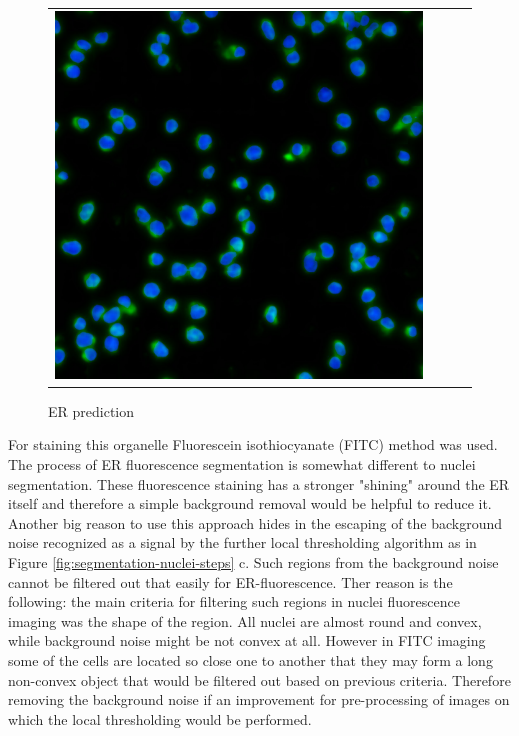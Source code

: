 \begin{figure}[H]
\begin{tabularx}{\textwidth}{YYYY}
            \includegraphics{bilder/ER/gt_nuclei.jpg}
        \end{tabularx}
    \caption{ER prediction}
    \label{fig:er-prediction}
\end{figure}

For staining this organelle Fluorescein isothiocyanate (FITC) method was used. The process of ER fluorescence segmentation is somewhat different to nuclei segmentation. These fluorescence staining has a stronger "shining" around the ER itself and therefore a simple background removal would be helpful to reduce it. Another big reason to use this approach hides in the escaping of the background noise recognized as a signal by the further local thresholding algorithm as in Figure \ref{fig:segmentation-nuclei-steps} c. Such regions from the background noise cannot be filtered out that easily for ER-fluorescence. Ther reason is the following: the main criteria for filtering such regions in nuclei fluorescence imaging was the shape of the region. All nuclei are almost round and convex, while background noise might be not convex at all. However in FITC imaging some of the cells are located so close one to another that they may form a long non-convex object that would be filtered out based on previous criteria. Therefore removing the background noise if an improvement for pre-processing of images on which the local thresholding would be performed.

